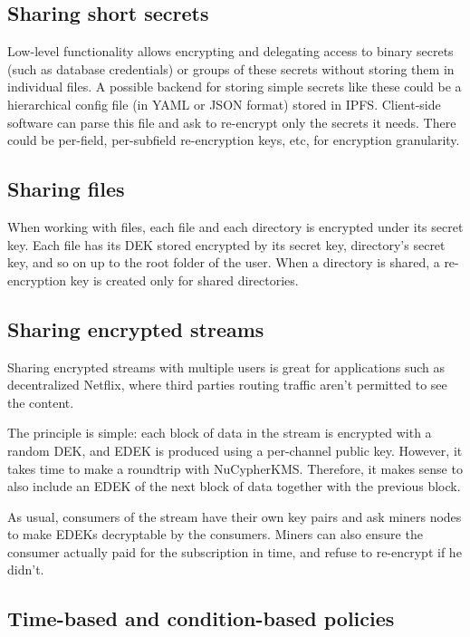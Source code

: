 \documentclass[notitlepage,longbibliography]{revtex4-1}
\newcommand{\kms}{NuCypherKMS}
\begin{document}
\subsection{Sharing short secrets}

Low-level functionality allows encrypting and delegating access to binary secrets (such as database credentials) or groups of these secrets without
storing them in individual files.
A possible backend for storing simple secrets like these could be a hierarchical config file (in YAML or JSON format) stored in IPFS.
Client-side software can parse this file and ask to re-encrypt only the secrets it needs.
There could be per-field, per-subfield re-encryption keys, etc, for encryption granularity.

\subsection{Sharing files}

When working with files, each file and each directory is encrypted under its secret key.
Each file has its DEK stored encrypted by its secret key, directory's secret key, and so on up to the root folder of the user.
When a directory is shared, a re-encryption key is created only for shared directories.

\subsection{Sharing encrypted streams}

Sharing encrypted streams with multiple users is great for applications such as decentralized Netflix, where third parties routing traffic
aren't permitted to see the content.

The principle is simple: each block of data in the stream is encrypted with a random DEK, and EDEK is produced using a per-channel public key.
However, it takes time to make a roundtrip with \kms.
Therefore, it makes sense to also include an EDEK of the next block of data together with the previous block.

As usual, consumers of the stream have their own key pairs and ask miners nodes to make EDEKs decryptable by the consumers.
Miners can also ensure the consumer actually paid for the subscription in time, and refuse to re-encrypt if he didn't.

\subsection{Time-based and condition-based policies}
\end{document}
